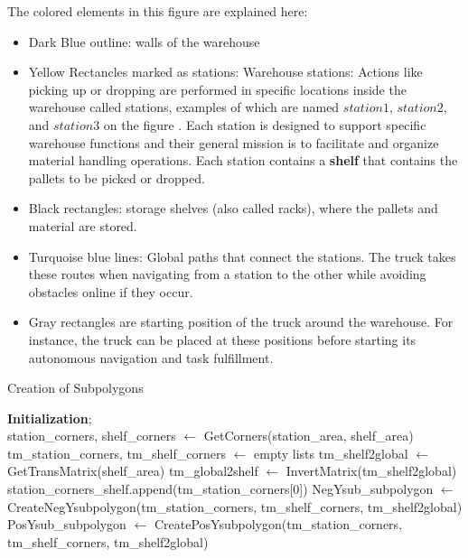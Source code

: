 The colored elements in this figure are explained here:
\begin{itemize}
    \item Dark Blue outline: walls of the warehouse
    \item Yellow Rectancles marked as stations: Warehouse stations: Actions like picking up or 
    dropping are performed in specific locations inside the warehouse called 
    stations, examples of which are named \(station1\), \(station2\), and \(station3\) on the figure .
    Each station is designed to support specific warehouse functions and their general mission
    is to facilitate and organize material handling operations. 
    Each station contains a \textbf{shelf} that contains the pallets to be picked or dropped. 
    \item Black rectangles: storage shelves (also called racks), where the  pallets and material are 
    stored. 
    \item Turquoise blue lines: Global paths that connect the stations.
    The truck takes these routes when navigating from a station to the other while avoiding 
    obstacles online if they occur.
    \item Gray rectangles are starting position of the truck around the warehouse. For instance,
    the truck can be placed at these positions before starting its autonomous navigation and 
    task fulfillment.

\end{itemize}



\noindent

\begin{algorithm}[H]
\caption{Creation of Subpolygons}\label{alg:createSubpolygons}
\BlankLine
\textbf{Initialization}; \\
station\_corners, shelf\_corners $\gets$ GetCorners(station\_area, shelf\_area)\;
tm\_station\_corners, tm\_shelf\_corners $\gets$ empty lists\;
tm\_shelf2global $\gets$ GetTransMatrix(shelf\_area)\;
tm\_global2shelf $\gets$ InvertMatrix(tm\_shelf2global)\;
station\_corners\_shelf.append(tm\_station\_corners[0])\;
NegYsub\_subpolygon $\gets$ CreateNegYsubpolygon(tm\_station\_corners, tm\_shelf\_corners, tm\_shelf2global)\;
PosYsub\_subpolygon $\gets$ CreatePosYsubpolygon(tm\_station\_corners, tm\_shelf\_corners, tm\_shelf2global)\;
\;
\end{algorithm}
\noindent



